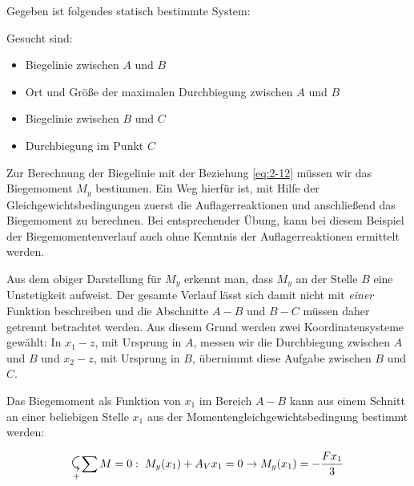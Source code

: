 \begin{example}
	Gegeben ist folgendes statisch bestimmte System:
	\begin{center}
		
	\end{center}
	Gesucht sind:
	\begin{itemize}
		\item Biegelinie zwischen $A$ und $B$
		\item Ort und Größe der maximalen Durchbiegung zwischen $A$ und $B$
		\item Biegelinie zwischen $B$ und $C$
		\item Durchbiegung im Punkt $C$
	\end{itemize}

	Zur Berechnung der Biegelinie mit der Beziehung \eqref{eq:2-12} müssen wir das Biegemoment $M_y$ bestimmen.
	Ein Weg hierfür ist, mit Hilfe der Gleichgewichtsbedingungen zuerst die Auflagerreaktionen und anschließend das Biegemoment zu berechnen. 
	Bei entsprechender Übung, kann bei diesem Beispiel der Biegemomentenverlauf auch ohne Kenntnis der Auflagerreaktionen ermittelt werden.  
	\begin{center}
		
	\end{center}
	Aus dem obiger Darstellung für $M_y$ erkennt man, dass $M_y$ an der Stelle $B$ eine Unstetigkeit aufweist.
	Der gesamte Verlauf lässt sich damit nicht mit \emph{einer} Funktion beschreiben und die Abschnitte $A-B$ und $B-C$ müssen daher getrennt betrachtet werden.
	Aus diesem Grund werden zwei Koordinatensysteme gewählt: In $x_1-z$, mit Ursprung in $A$, messen wir die Durchbiegung zwischen $A$ und $B$ und  $x_2-z$, mit Ursprung in $B$, übernimmt diese Aufgabe zwischen $B$ und $C$. 

	Das Biegemoment als Funktion von $x_1$ im Bereich $A-B$ kann aus einem Schnitt an einer beliebigen Stelle $x_1$ aus der Momentengleichgewichtsbedingung bestimmt werden: \\
	
	\begin{minipage}{0.4\textwidth}
		\begin{flushright}
			
		\end{flushright}
	\end{minipage}
	\begin{minipage}{0.5\textwidth}
		\[
		\pmr\sum M=0:\; M_y(x_1) + A_Vx_1 = 0\rightarrow M_y(x_1) = -\dfrac{Fx_1}{3}
		\]
	\end{minipage}
	

\end{example}
